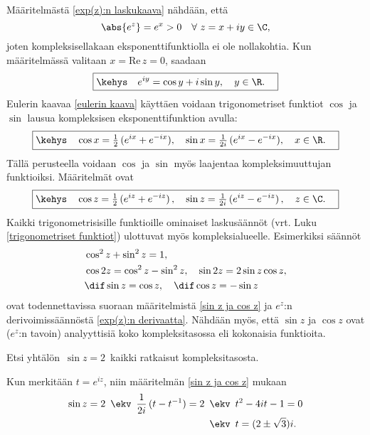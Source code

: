 Määritelmästä \eqref{exp(z):n laskukaava} nähdään, että
\[
\abs{e^z} = e^x > 0 \quad \forall\ z=x+iy \in \C,
\]
joten kompleksisellakaan eksponenttifunktiolla ei ole nollakohtia. Kun määritelmässä valitaan
$x=\text{Re}\,z=0$, saadaan 
 
\begin{equation} \label{eulerin kaava}
\boxed{\kehys\quad e^{iy}=\cos y + i\sin y,\quad y\in\R. \quad}
\end{equation}
Eulerin kaavaa \eqref{eulerin kaava} käyttäen voidaan trigonometriset funktiot $\cos$ ja $\sin$
lausua kompleksisen eksponenttifunktion avulla:
\begin{equation} \label{sin ja cos exp(z):n avulla}
\boxed{\kehys\quad \cos x=\tfrac{1}{2}\,(e^{ix}+e^{-ix}),\quad 
                   \sin x=\tfrac{1}{2i}\,(e^{ix}-e^{-ix}),\quad x\in\R. \quad}
\end{equation}
Tällä perusteella voidaan $\cos$ ja $\sin$ myös laajentaa kompleksimuuttujan funktioiksi. 
Määritelmät ovat
\begin{equation} \label{sin z ja cos z}
\boxed{\kehys\quad \cos z=\tfrac{1}{2}\,(e^{iz}+e^{-iz})\,,\quad 
                   \sin z=\tfrac{1}{2i}\,(e^{iz}-e^{-iz})\,,\quad z\in\C. \quad}
\end{equation}
Kaikki trigonometrisisille funktioille ominaiset laskusäännöt 
(vrt. Luku \ref{trigonometriset funktiot}) ulottuvat myös kompleksialueelle. Esimerkiksi
säännöt
\begin{align*}
&\cos^2 z+\sin^2 z = 1, \\
&\cos 2z = \cos^2 z-\sin^2 z, \quad \sin 2z = 2\sin z \cos z, \\
&\dif\sin z = \cos z, \quad \dif\cos z = -\sin z
\end{align*}
ovat todennettavissa suoraan määritelmistä \eqref{sin z ja cos z} ja $e^z$:n
derivoimissäännöstä \eqref{exp(z):n derivaatta}. Nähdään myös, että $\sin z$ ja $\cos z$
ovat ($e^z$:n tavoin) analyyttisiä koko kompleksitasossa eli kokonaisia funktioita.
\begin{Exa} Etsi yhtälön $\,\sin z = 2\,$ kaikki ratkaisut kompleksitasosta. 
\end{Exa}
\ratk Kun merkitään $t=e^{iz}$, niin määritelmän \eqref{sin z ja cos z} mukaan
\begin{align*}
\sin z = 2\,\ \ekv\,\ \frac{1}{2i}\,(t-t^{-1}) = 2\,\ &\ekv\,\ t^2-4it-1=0 \\
                                                      &\ekv\,\ t = (2\pm\sqrt{3})i.
\end{align*}
